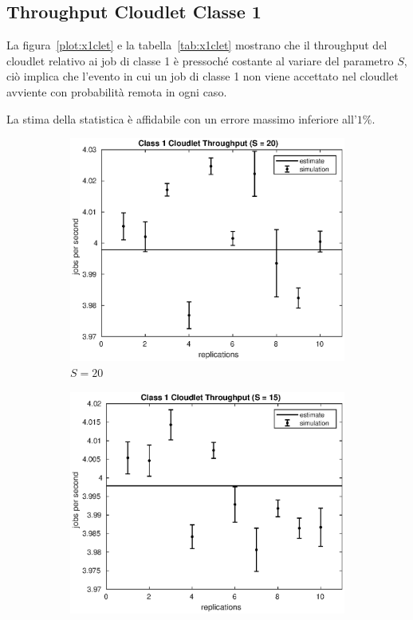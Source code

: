 \subsection{Throughput Cloudlet Classe 1}
La figura~\ref{plot:x1clet} e la tabella~\ref{tab:x1clet} mostrano che il
throughput del cloudlet relativo ai job di classe 1 è pressoché costante al
variare del parametro $S$, ciò implica che l'evento in cui un job di classe 1
non viene accettato nel cloudlet avviente con probabilità remota in ogni caso.

La stima della statistica è affidabile con un errore massimo inferiore
all'$1\%$.  
\begin{figure}[!h]
\centering
%
\begin{subfigure}[t]{0.49\textwidth}
\includegraphics[width=\textwidth]{figures/simul/20_500K_x1clet}
\caption{$S = 20$}
\label{20_x1clet}
\end{subfigure}
%
\begin{subfigure}[t]{0.49\textwidth}
\includegraphics[width=\textwidth]{figures/simul/15_500K_x1clet}

\end{subfigure}
\end{figure}
